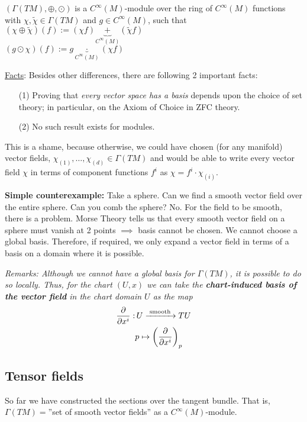 \begin{definition}
$(\Gamma(TM),\oplus,\odot)$ is a $C^{\infty}(M)$-module over the ring of $C^{\infty}(M)$ functions with $\chi, \widetilde{\chi} \in \Gamma(TM)$ and $g \in C^{\infty}(M)$, such that \\
$(\chi \oplus \widetilde{\chi})(f) := (\chi f) \underbrace{+}_{C^{\infty}(M)} (\widetilde{\chi}f)$ \\
$(g \odot \chi)(f) := g \underbrace{\cdot}_{C^{\infty}(M)} (\chi f)$
\end{definition}

\underline{Facts}: Besides other differences, there are following 2 important facts:
\begin{enumerate}
\item[(1)] Proving that \textit{every vector space has a basis} depends upon the choice of set theory; in particular, on the Axiom of Choice in ZFC theory.
\item[(2)] No such result exists for modules.  
\end{enumerate}

This is a shame, because otherwise, we could have chosen (for any manifold) vector fields, $\chi_{(1)}, \dotsc, \chi_{(d)} \in \Gamma(TM)$ and would be able to write every vector field $\chi$ in terms of component functions $f^i$ as $\chi = f^i \cdot \chi_{(i)}$.

\textbf{Simple counterexample:} Take a sphere. Can we find a smooth vector field over the entire sphere. Can you comb the sphere? No. For the field to be smooth, there is a problem. Morse Theory tells us that every smooth vector field on a sphere must vanish at 2 points $\implies$ basis cannot be chosen. We cannot choose a global basis. Therefore, if required, we only expand a vector field in terms of a basis on a domain where it is possible.


\textit{Remarks: Although we cannot have a global basis for $\Gamma(TM)$, it is possible to do so locally. Thus, for the chart $(U,x)$ we can take the \textbf{chart-induced basis of the vector field} in the chart domain $U$ as the map \\
\begin{equation}
\begin{split}
  \frac{\partial }{\partial x^i} : & \, U \xrightarrow{\text{ smooth }} TU \\
  & p \mapsto \left(\frac{\partial }{\partial x^i}\right)_p
\end{split}
\end{equation}
}

\subsection{Tensor fields}
So far we have constructed the sections over the tangent bundle. That is, $\Gamma(TM) = $''set of smooth vector fields'' as a $C^{\infty}(M)$-module.


